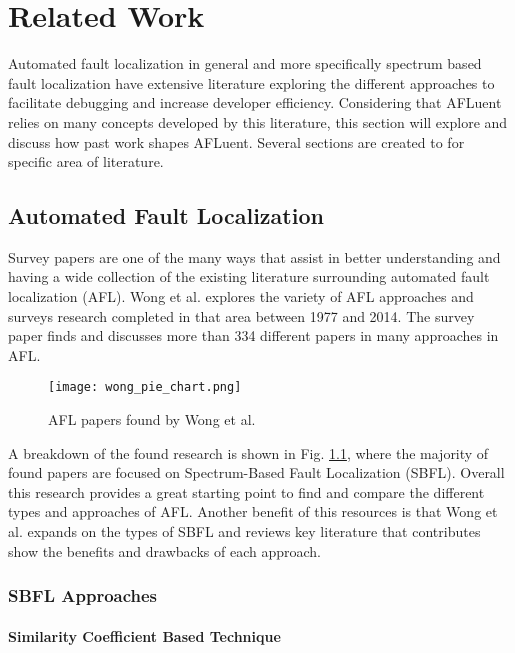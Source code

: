 \chapter{Related Work}
\label{ch:relatedwork}

Automated fault localization in general and more specifically spectrum based
fault localization have extensive literature exploring the different approaches
to facilitate debugging and increase developer efficiency. Considering that
AFLuent relies on many concepts developed by this literature, this section will
explore and discuss how past work shapes AFLuent. Several sections are created
to for specific area of literature.

\section{Automated Fault Localization}
\label{sec:AFLlit}

Survey papers are one of the many ways that assist in better
understanding and having a wide collection of the existing
literature surrounding automated fault localization (AFL).
Wong et al. \cite{wong2016survey} explores the variety of AFL approaches and
surveys research completed in that area between 1977 and 2014. The survey paper finds and
discusses more than 334 different papers in many approaches in AFL.
\begin{figure}[!htb]
	\begin{center}
		\texttt{[image: wong\_pie\_chart.png]}
		\caption{\label{fig:wong_breakdown} AFL papers found by Wong et al. \cite{wong2016survey}}
	\end{center}
\end{figure}

A breakdown of the found research is shown in Fig. \ref{fig:wong_breakdown}, where the
majority of found papers are focused on Spectrum-Based Fault Localization (SBFL).
Overall this research provides a great
starting point to find and compare the different types and approaches of AFL.
Another benefit of this resources is that
Wong et al. \cite{wong2016survey} expands on the types of SBFL
and reviews key literature that contributes show the benefits and drawbacks of
each approach.

\subsection{SBFL Approaches}
\label{subsec:sbfl}

\subsubsection{Similarity Coefficient Based Technique}
\label{subsubsec:coefficient_based}

